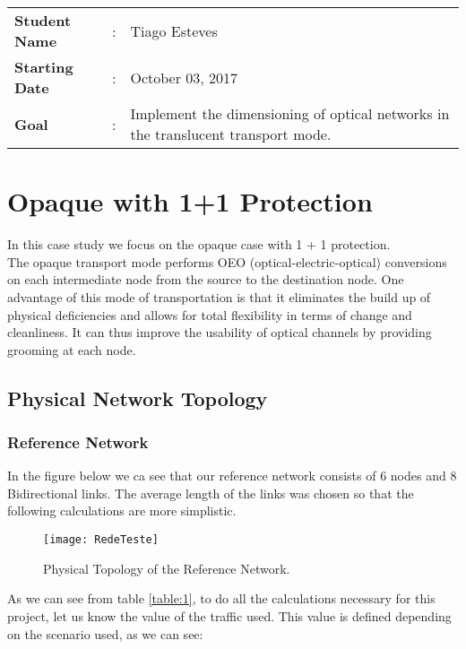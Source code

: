 \clearpage

\begin{tcolorbox}	
\begin{tabular}{p{2.75cm} p{0.2cm} p{10.5cm}} 	
\textbf{Student Name}  &:& Tiago Esteves\\
\textbf{Starting Date} &:& October 03, 2017\\
\textbf{Goal}          &:& Implement the dimensioning of optical networks in the translucent transport mode.
\end{tabular}
\end{tcolorbox}

\section{Opaque with 1+1 Protection}
In this case study we focus on the opaque case with 1 + 1 protection. \\
The opaque transport mode performs OEO (optical-electric-optical) conversions on each intermediate node from the source to the destination node.
One advantage of this mode of transportation is that it eliminates the build up of physical deficiencies and allows for total flexibility in terms of change and cleanliness.
It can thus improve the usability of optical channels by providing grooming at each node.

\subsection{Physical Network Topology}

\subsubsection{Reference Network}
In the figure below we ca see that our reference network consists of 6 nodes and 8 Bidirectional links.
The average length of the links was chosen so that the following calculations are more simplistic.

\begin{figure}[h!]
\centering
\texttt{[image: RedeTeste]}
\caption{Physical Topology of the Reference Network.}
\end{figure}

\vspace{10pt}

As we can see from table \ref{table:1}, to do all the calculations necessary for this project, let us know the value of the traffic used. This value is defined depending on the scenario used, as we can see:

